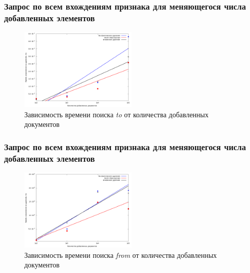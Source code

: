 \documentclass[aspectratio=169, pdf, 8pt, unicode]{beamer}
\begin{document}
\begin{frame}[fragile]
\frametitle{Запрос по всем вхождениям признака для меняющегося числа
добавленных элементов}
\begin{figure}[H]
\centering
\includegraphics[width=0.5\textwidth]{fig/to.png}
\caption{Зависимость времени поиска \textit{to} от количества добавленных документов}
\end{figure}
\end{frame}

\begin{frame}[fragile]
\frametitle{Запрос по всем вхождениям признака для меняющегося числа
добавленных элементов}
\begin{figure}[H]
\centering
\includegraphics[width=0.5\textwidth]{fig/from.png}
\caption{Зависимость времени поиска \textit{from} от количества добавленных документов}
\end{figure}
\end{frame}
\end{document}
